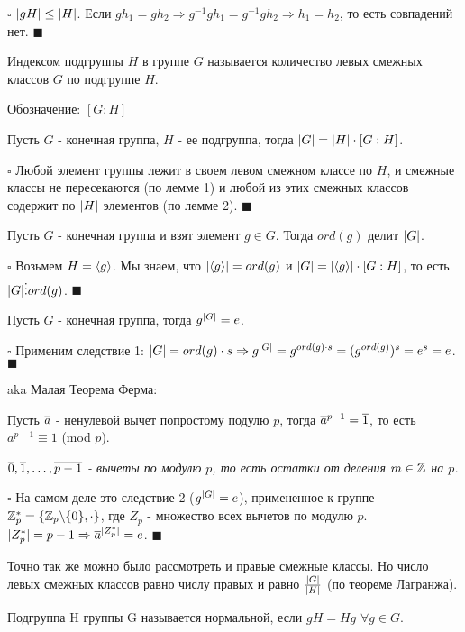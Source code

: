 \documentclass[../main.tex]{subfiles}
\begin{document}
\void
$\square$ $\vert gH\vert\leq \vert H\vert$. Если $gh_1 = gh_2 \Rightarrow g^{-1}gh_1 = g^{-1}gh_2
\Rightarrow h_1 = h_2$, то есть совпадений нет. $\blacksquare$

\void
{} Индексом подгруппы $H$ в группе $G$ называется количество левых смежных классов $G$ по подгруппе $H$.

Обозначение: $[G:H]$

\void
{}

Пусть $G$ - конечная группа, $H$ - ее подгруппа, тогда $\vert G\vert = \vert H\vert\cdot [G:H]$.

\void
$\square$ Любой элемент группы лежит в своем левом смежном классе по $H$, и смежные классы не пересекаются
(по лемме 1) и любой из этих смежных классов содержит по $\vert H\vert$ элементов (по лемме 2).
$\blacksquare$

\void
{} Пусть $G$ - конечная группа и взят элемент $g\in G$. Тогда $ord(g)$ делит $\vert G\vert$.

\void
$\square$ Возьмем $H = \langle g\rangle$. Мы знаем, что $\vert \langle g\rangle\vert = ord(g)$ и
$\vert G\vert = \vert \langle g\rangle\vert\cdot [G:H]$, то есть $\vert G\vert\vdots ord(g)$.
$\blacksquare$

\void
{} Пусть $G$ - конечная группа, тогда $g^{\vert G\vert} = e$.

\void
$\square$ Применим следствие 1: $\vert G\vert = ord(g)\cdot s \Rightarrow g^{\vert G\vert} = g^{ord(g)\cdot s} =
(g^{ord(g)})^s = e^s = e$.
$\blacksquare$

\void
{} aka Малая Теорема Ферма:

Пусть $\overline{a}$ - ненулевой вычет попростому подулю $p$, тогда $\overline{a}^{p-1} = \overline{1}$,
то есть $a^{p-1}\equiv 1$ (mod $p$).

\void
\textit{$\overline{0}, \overline{1},\dots,\overline{p-1}$ - вычеты по модулю $p$, то есть остатки от деления
$m\in\mathbb{Z}$ на $p$.}

\void
$\square$ На самом деле это следствие 2 ($g^{\vert G\vert} = e$), примененное к группе 
$\mathbb{Z}_p^* = \{ \mathbb{Z}_p\backslash \{0\}, \cdot \}$, где $Z_p$ - множество всех вычетов по модулю $p$.
$\vert Z_p^*\vert = p - 1 \Rightarrow \overline{a}^{\vert Z_p^*\vert} = e$.
$\blacksquare$

\void
{} Точно так же можно было рассмотреть и правые смежные классы. Но число левых смежных классов
равно числу правых и равно $\frac{\vert G\vert}{\vert H\vert}$ (по теореме Лагранжа).

\void
{} Подгруппа H группы G называется нормальной, если $gH = Hg$ $\forall g\in G$.
\end{document}
